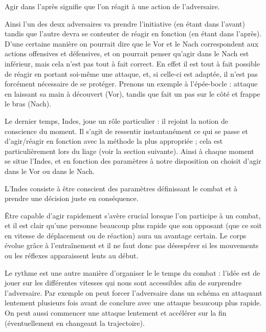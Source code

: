 \begin{definition}

	Agir dans l'après signifie que l'on réagit à une action de l'adversaire.
\end{definition}


Ainsi l'un des deux adversaires va prendre l'initiative (en étant dans l'avant) tandis que l'autre devra se contenter de réagir en fonction (en étant dans l'après).
D'une certaine manière on pourrait dire que le Vor et le Nach correspondent aux actions offensives et défensives, et on pourrait penser qu'agir dans le Nach est inférieur, mais cela n'est pas tout à fait correct.
En effet il est tout à fait possible de réagir en portant soi-même une attaque, et, si celle-ci est adaptée, il n'est pas forcément nécessaire de se protéger.
Prenons un exemple à l'épée-bocle : \A attaque en laissant sa main à découvert (Vor), tandis que \D fait un pas sur le côté et frappe le bras (Nach).


Le dernier temps, Indes, joue un rôle particulier : il rejoint la notion de conscience du moment.
Il s'agit de ressentir instantanément ce qui se passe et d'agir/réagir en fonction avec la méthode la plus appropriée ; cela est particulièrement lors du liage (voir la section suivante).
Ainsi à chaque moment se situe l'Indes, et en fonction des paramètres à notre disposition on choisit d'agir dans le Vor ou dans le Nach.

\begin{definition}

	L'Indes consiste à être conscient des paramètres définissant le combat et à prendre une décision juste en conséquence.
\end{definition}


Être capable d'agir rapidement s'avère crucial lorsque l'on participe à un combat, et il est clair qu'une personne beaucoup plus rapide que son opposant (que ce soit en vitesse de déplacement ou de réaction) aura un avantage certain.
Le corps évolue grâce à l'entraînement et il ne faut donc pas désespérer si les mouvements ou les réflexes apparaissent lents au début.

Le rythme est une autre manière d'organiser le le temps du combat : l'idée est de jouer sur les différentes vitesses qui nous sont accessibles afin de surprendre l'adversaire.
Par exemple on peut forcer l'adversaire dans un schéma en attaquant lentement plusieurs fois avant de conclure avec une attaque beaucoup plus rapide.
On peut aussi commencer une attaque lentement et accélérer sur la fin (éventuellement en changeant la trajectoire).


